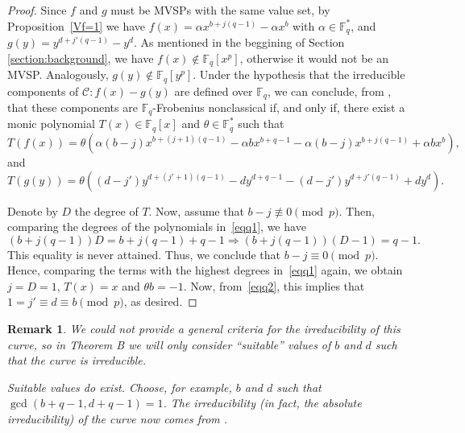\documentclass[preprint,12pt]{elsarticle}
\newtheorem{remark}[theorem]{Remark}
\begin{document}
\begin{proof}
Since $f$ and $g$ must be MVSPs with the same value set, by Proposition~\ref{Vf=1} we have $f(x) = \alpha x^{b + j(q - 1)} - \alpha x^b$ with $\alpha \in \mathbb{F}_q^*$, and $g(y) = y^{d + j'(q - 1)} - y^d$. As mentioned in the beggining of Section \ref{section:background}, we have $f(x) \notin \mathbb{F}_q[x^p]$, otherwise it would not be an MVSP. Analogously, $g(y) \notin \mathbb{F}_q[y^p]$. Under the hypothesis that the irreducible components of $\mathcal{C}: f(x) - g(y)$ are defined over $\mathbb{F}_q$, we can conclude, from \cite[Theorem 3.4]{borges-separated}, that these components are $\mathbb{F}_q$-Frobenius nonclassical if, and only if, there exist a monic polynomial $T(x) \in \mathbb{F}_q[x]$ and $\theta\in\mathbb{F}_q^*$ such that
\begin{equation} \label{eqq1}
    T(f(x)) = \theta(\alpha (b - j) x^{b + (j+1)(q-1)} - \alpha b x^{b + q -1} - \alpha(b - j) x^{b + j (q-1)} + \alpha b x^b),
\end{equation}
and
\begin{equation} \label{eqq2}
    T(g(y)) = \theta((d - j') y^{d + (j'+1)(q-1)} - d y^{d + q -1} - (d - j') y^{d + j'(q-1)} + d y^d).
\end{equation}

Denote by $D$ the degree of $T$. Now, assume that $b - j \not\equiv 0 \pmod{p}$. Then, comparing the degrees of the polynomials in~\eqref{eqq1}, we have
$$
(b + j(q-1))D= b + j(q-1) + q-1 \Longrightarrow(b + j(q - 1))(D - 1) = q - 1.
$$
This equality is never attained. Thus, we conclude that $b - j \equiv 0 \pmod{p}$. Hence, comparing the terms with the highest degrees in~\eqref{eqq1} again, we obtain $j = D = 1$, $T(x) = x$ and $\theta b = -1$. Now, from~\eqref{eqq2}, this implies that $1 = j' \equiv d \equiv b \pmod{p}$, as desired.
\end{proof}

\begin{remark}
    We could not provide a general criteria for the irreducibility of this curve, so in Theorem B we will only consider ``suitable'' values of $b$ and $d$ such that the curve is irreducible.

    Suitable values do exist. Choose, for example, $b$ and $d$ such that $\gcd(b+q-1,d+q-1)=1$. The irreducibility (in fact, the absolute irreducibility) of the curve now comes from \cite[Theorem III.1.B]{schmidt}. 
\end{remark}
\end{document}
